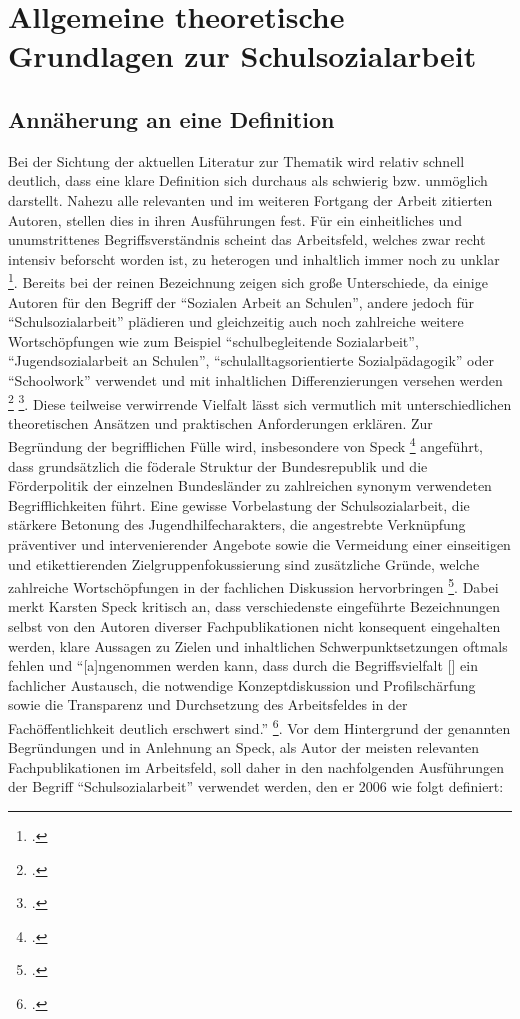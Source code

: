 \section{Allgemeine theoretische Grundlagen zur Schulsozialarbeit}
\label{sec:AllgemeineTheoretischeGrundlagenZurSchulsozialarbeit}

\subsection{Annäherung an eine Definition}
\label{sec:AnnäherungAnEineDefinition}

Bei der Sichtung der aktuellen Literatur zur Thematik wird relativ schnell deutlich, dass eine klare Definition sich durchaus als schwierig bzw. unmöglich darstellt. Nahezu alle relevanten und im weiteren Fortgang der Arbeit zitierten Autoren, stellen dies in ihren Ausführungen fest. Für ein einheitliches und unumstrittenes Begriffsverständnis scheint das Arbeitsfeld, welches zwar recht intensiv beforscht worden ist, zu heterogen und inhaltlich immer noch zu unklar \footcite[vgl.][7]{Speck2010}. Bereits bei der reinen Bezeichnung zeigen sich große Unterschiede, da einige Autoren für den Begriff der "`Sozialen Arbeit an Schulen"', andere jedoch für "`Schulsozialarbeit"' plädieren und gleichzeitig auch noch zahlreiche weitere Wortschöpfungen wie zum Beispiel "`schulbegleitende Sozialarbeit"', "`Jugendsozialarbeit an Schulen"', "`schulalltagsorientierte Sozialpädagogik"' oder "`Schoolwork"' verwendet und mit inhaltlichen Differenzierungen versehen werden \footcite [vgl.][14]{Spies2011} \footcite[vgl.][17f]{Stuewe2015}. Diese teilweise verwirrende Vielfalt lässt sich vermutlich mit unterschiedlichen theoretischen Ansätzen und praktischen Anforderungen erklären. Zur Begründung der begrifflichen Fülle wird, insbesondere von Speck \footcite[vgl.][23]{Speck2007} angeführt, dass grundsätzlich die föderale Struktur der Bundesrepublik und die Förderpolitik der einzelnen Bundesländer zu zahlreichen synonym verwendeten Begrifflichkeiten führt. Eine gewisse Vorbelastung der Schulsozialarbeit, die stärkere Betonung des Jugendhilfecharakters, die angestrebte Verknüpfung präventiver und intervenierender Angebote sowie die Vermeidung einer einseitigen und etikettierenden Zielgruppenfokussierung sind zusätzliche Gründe, welche zahlreiche Wortschöpfungen in der fachlichen Diskussion hervorbringen \footcite[vgl.][23]{Speck2007}. Dabei merkt Karsten Speck kritisch an, dass verschiedenste eingeführte Bezeichnungen selbst von den Autoren diverser Fachpublikationen nicht konsequent eingehalten werden, klare Aussagen zu Zielen und inhaltlichen Schwerpunktsetzungen oftmals fehlen und "`[a]ngenommen werden kann, dass durch die Begriffsvielfalt [\punkte] ein fachlicher Austausch, die notwendige Konzeptdiskussion und Profilschärfung sowie die Transparenz und Durchsetzung des Arbeitsfeldes in der Fachöffentlichkeit deutlich erschwert sind."' \footcite[24]{Speck2007}. Vor dem Hintergrund der genannten Begründungen und in Anlehnung an Speck, als Autor der meisten relevanten Fachpublikationen im Arbeitsfeld, soll daher in den nachfolgenden Ausführungen der Begriff "`Schulsozialarbeit"' verwendet werden, den er 2006 wie folgt definiert:

